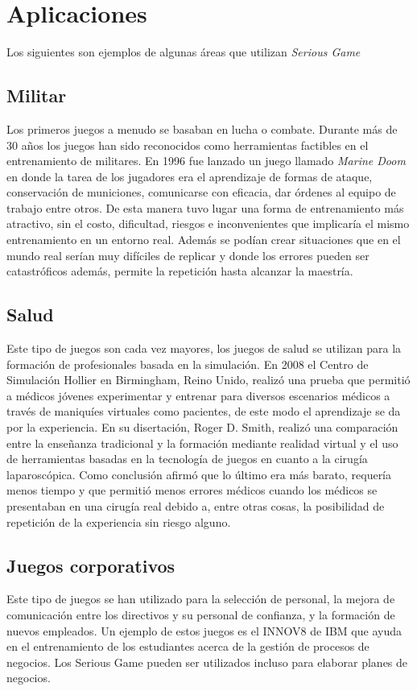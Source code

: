 \section{Aplicaciones}

Los siguientes son ejemplos de algunas áreas que utilizan \textit{Serious Game}


\subsection{Militar}

Los primeros juegos a menudo se basaban en lucha o combate.
Durante más de 30 años los juegos han sido reconocidos como herramientas
factibles en el entrenamiento de militares. En 1996 fue lanzado un juego
llamado \emph{Marine Doom} en donde la tarea de los jugadores era el
aprendizaje de formas de ataque, conservación de municiones, comunicarse
con eficacia, dar órdenes al equipo de trabajo entre otros. De esta
manera tuvo lugar una forma de entrenamiento más atractivo, sin el
costo, dificultad, riesgos e inconvenientes que implicaría el mismo
entrenamiento en un entorno real. Además se podían crear situaciones que
en el mundo real serían muy difíciles de replicar y donde los errores
pueden ser catastróficos además, permite la repetición hasta alcanzar la
maestría\cite{education:games}.

\subsection{Salud}

Este tipo de juegos son cada vez mayores, los juegos de salud se
utilizan para la formación de profesionales basada en la simulación. En
2008 el Centro de Simulación Hollier en Birmingham, Reino Unido, realizó
una prueba que permitió a médicos jóvenes experimentar y entrenar para
diversos escenarios médicos a través de maniquíes virtuales como
pacientes, de este modo el aprendizaje se da por la experiencia. En su
disertación, Roger D. Smith, realizó una comparación entre la enseñanza
tradicional y la formación mediante realidad virtual y el uso de
herramientas basadas en la tecnología de juegos en cuanto a la cirugía
laparoscópica. Como conclusión afirmó que lo último era más barato,
requería menos tiempo y que permitió menos errores médicos cuando los
médicos se presentaban en una cirugía real debido a, entre otras cosas,
la posibilidad de repetición de la experiencia sin riesgo
alguno\cite{education:games}.


\subsection{Juegos corporativos}

Este tipo de juegos se han utilizado para la
selección de personal, la mejora de comunicación entre los directivos y
su personal de confianza, y la formación de nuevos empleados. Un ejemplo
de estos juegos es el INNOV8 de IBM que ayuda en el entrenamiento de los
estudiantes acerca de la gestión de procesos de negocios. Los Serious
Game pueden ser utilizados incluso para elaborar planes de
negocios\cite{education:games}. 

